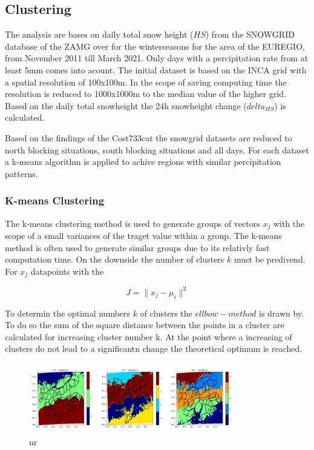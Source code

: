 \subsection{Clustering}

\noindent The analysis are bases on daily total snow height ($HS$) from the SNOWGRID database of the ZAMG over for the winterseasons
for the area of the EUREGIO, from November 2011 till March 2021. Only days with a percipitation rate from at least 
5mm comes into acount. The initial dataset is based on the INCA grid with a spatial resolution of 100x100m. In the scope of saving computing
time the resolution is reduced to 1000x1000m to the median value of the higher grid. Based on the daily total snowheight
the 24h snowheight change ($delta_{HS}$) is calculated.

\noindent Based on the findings of the Cost733cat the snowgrid datasets are reduced to north blocking situations, south blocking situations 
and all days. For each dataset a k-means algorithm is applied to achive regions with similar percipitation patterns.

\subsubsection*{K-means Clustering}

The k-means clustering method is used to generate groups of vectors $x_j$ with the scope of a small variances of the traget value
within a group. The k-means method is often used to generate similar groups due to its relativly fast computation time. 
On the downside the number of clusters $k$ must be predivend. For $x_j$ datapoints with the 

\begin{equation}
    J =  \parallel x_j -\mu_i \parallel ^{2}
    \label{equ:cluster}
 \end{equation}

 To determin the optimal numbers $k$ of clusters the $ellbow-method$ is drawn by. To do so the sum of the square distance between the points in 
 a cluster are calculated for increasing cluster number k. At the point where a increasing of clusters do not lead to a significantn 
 change the theoretical optimum is reached.  

 \begin{figure}[h]
    \centering
    \includegraphics[width=0.8\textwidth]{Figures/figures_methods/number_clusters.png}
    \caption{nr}
    \label{fig:number_of_clusters}
\end{figure}

